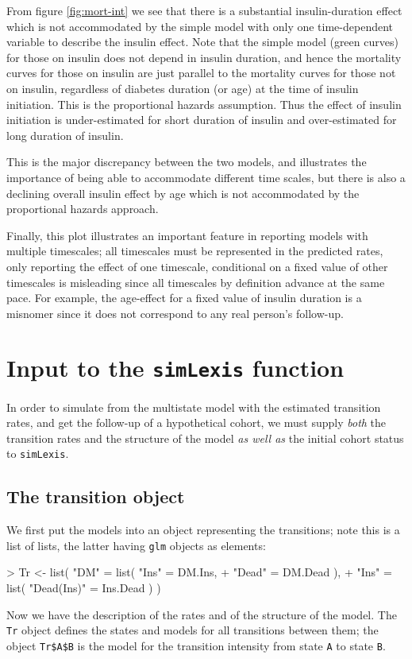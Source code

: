 \documentclass[a4paper,twoside,12pt]{report}
\begin{document}
From figure \ref{fig:mort-int} we see that there is a substantial
insulin-duration effect which is not accommodated by the simple model
with only one time-dependent variable to describe the insulin
effect. Note that the simple model (green curves) for those on insulin
does not depend in insulin duration, and hence the mortality curves
for those on insulin are just parallel to the mortality curves for
those not on insulin, regardless of diabetes duration (or age) at the
time of insulin initiation. This is the proportional hazards
assumption.  Thus the effect of insulin initiation is under-estimated
for short duration of insulin and over-estimated for long duration of
insulin.

This is the major discrepancy between the two models, and
illustrates the importance of being able to accommodate different time
scales, but there is also a declining overall insulin effect by age which
is not accommodated by the proportional hazards approach.

Finally, this plot illustrates an important feature in reporting
models with multiple timescales; all timescales must be represented in
the predicted rates, only reporting the effect of one timescale,
conditional on a fixed value of other timescales is misleading since
all timescales by definition advance at the same pace. For example,
the age-effect for a fixed value of insulin duration is a misnomer
since it does not correspond to any real person's follow-up.

\section{Input to the \texttt{simLexis} function}

In order to simulate from the multistate model with the estimated
transition rates, and get the follow-up of a hypothetical cohort, we
must supply \emph{both} the transition rates and the structure of the
model \emph{as well as} the initial cohort status to
\texttt{simLexis}.

\subsection{The transition object}

We first put the models into an object representing the transitions;
note this is a list of lists, the latter having \texttt{glm} objects
as elements:
\begin{Schunk}
\begin{Sinput}
> Tr <- list( "DM" = list( "Ins"       = DM.Ins,
+                          "Dead"      = DM.Dead  ),
+            "Ins" = list( "Dead(Ins)" = Ins.Dead ) )
\end{Sinput}
\end{Schunk}
Now we have the description of the rates and of the structure of the
model. The \texttt{Tr} object defines the states and models for all
transitions between them; the object \verb|Tr$A$B| is the model
for the transition intensity from state \texttt{A} to state
\texttt{B}.
\end{document}
